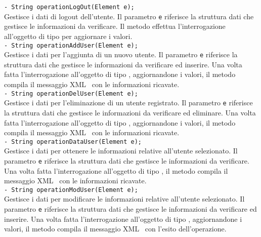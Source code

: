 {{\begin{sloppypar}
{{{\begin{itemize}
{					\texttt{- String operationLogOut(Element e);}\\
					Gestisce i dati di logout dell'utente. Il parametro \texttt{e} riferisce la struttura dati che gestisce le informazioni da verificare.
					Il metodo effettua l'interrogazione all'oggetto di tipo  per aggiornare i valori.\\
					
					\texttt{- String operationAddUser(Element e);}\\
					Gestisce i dati per l'aggiunta di un nuovo utente. Il parametro \texttt{e} riferisce la struttura dati che gestisce le informazioni da verificare ed inserire.
					Una volta fatta l'interrogazione all'oggetto di tipo , aggiornandone i valori, il metodo compila il messaggio XML\g~ con le informazioni ricavate.\\
					
					\texttt{- String operationDelUser(Element e);}\\
					Gestisce i dati per l'eliminazione di un utente registrato. Il parametro \texttt{e} riferisce la struttura dati che gestisce le informazioni da verificare ed eliminare.
					Una volta fatta l'interrogazione all'oggetto di tipo , aggiornandone i valori, il metodo compila il messaggio XML\g~ con le informazioni ricavate.\\
					
					\texttt{- String operationDataUser(Element e);}\\
					Gestisce i dati per ottenere le informazioni relative all'utente selezionato. Il parametro \texttt{e} riferisce la struttura dati che gestisce le informazioni da verificare.
					Una volta fatta l'interrogazione all'oggetto di tipo , il metodo compila il messaggio XML\g~ con le informazioni ricavate.\\
					
					\texttt{- String operationModUser(Element e);}\\
					Gestisce i dati per modificare le informazioni relative all'utente selezionato. Il parametro \texttt{e} riferisce la struttura dati che gestisce le informazioni da verificare ed inserire.
					Una volta fatta l'interrogazione all'oggetto di tipo , aggiornandone i valori, il metodo compila il messaggio XML\g~ con l'esito dell'operazione.\\
					
}
\end{itemize}}}}
\end{sloppypar}}}

